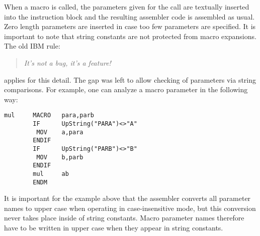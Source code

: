 \documentclass[12pt,twoside]{report}
\begin{document}
When a macro is called, the parameters given for the call are
textually inserted into the instruction block and the resulting
assembler code is assembled as usual.  Zero length parameters are
inserted in case too few parameters are specified.  It is important
to note that string constants are not protected from macro
expansions.  The old IBM rule:
\begin{quote}{\it
 It's not a bug, it's a feature!
}\end{quote}
applies for this detail.  The gap was left to allow checking of
parameters via string comparisons.  For example, one can analyze a
macro parameter in the following way:
\begin{verbatim}
mul     MACRO   para,parb
        IF      UpString("PARA")<>"A"
         MOV    a,para
        ENDIF
        IF      UpString("PARB")<>"B"
         MOV    b,parb
        ENDIF
        mul     ab
        ENDM
\end{verbatim}
It is important for the example above that the assembler converts all
parameter names to upper case when operating in case-insensitive
mode, but this conversion never takes place inside of string constants. 
Macro parameter names therefore have to be written in upper case when
they appear in string constants.
\end{document}
